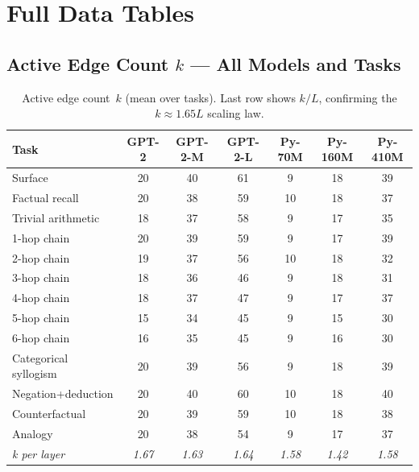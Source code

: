 \documentclass{article}
\begin{document}



\appendix

\section{Full Data Tables}

\subsection{Active Edge Count $k$ — All Models and Tasks}

\begin{table}[h]
\centering
\small
\begin{tabular}{lcccccc}
\toprule
\textbf{Task} & \textbf{GPT-2} & \textbf{GPT-2-M} & \textbf{GPT-2-L}
              & \textbf{Py-70M} & \textbf{Py-160M} & \textbf{Py-410M} \\
\midrule
Surface               & 20 & 40 & 61 &  9 & 18 & 39 \\
Factual recall        & 20 & 38 & 59 & 10 & 18 & 37 \\
Trivial arithmetic    & 18 & 37 & 58 &  9 & 17 & 35 \\
1-hop chain           & 20 & 39 & 59 &  9 & 17 & 39 \\
2-hop chain           & 19 & 37 & 56 & 10 & 18 & 32 \\
3-hop chain           & 18 & 36 & 46 &  9 & 18 & 31 \\
4-hop chain           & 18 & 37 & 47 &  9 & 17 & 37 \\
5-hop chain           & 15 & 34 & 45 &  9 & 15 & 30 \\
6-hop chain           & 16 & 35 & 45 &  9 & 16 & 30 \\
Categorical syllogism & 20 & 39 & 56 &  9 & 18 & 39 \\
Negation+deduction    & 20 & 40 & 60 & 10 & 18 & 40 \\
Counterfactual        & 20 & 39 & 59 & 10 & 18 & 38 \\
Analogy               & 20 & 38 & 54 &  9 & 17 & 37 \\
\midrule
\emph{k per layer}    & \emph{1.67} & \emph{1.63} & \emph{1.64}
                      & \emph{1.58} & \emph{1.42} & \emph{1.58} \\
\bottomrule
\end{tabular}
\caption{Active edge count~$k$ (mean over tasks).
Last row shows $k/L$, confirming the $k \approx 1.65L$ scaling law.}
\end{table}
\end{document}
